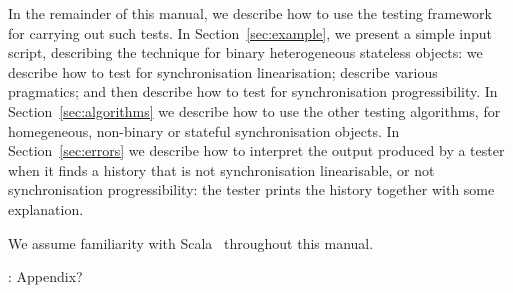 In the remainder of this manual, we describe how to use the testing framework
for carrying out such tests.  In Section~\ref{sec:example}, we present a
simple input script, describing the technique for binary heterogeneous
stateless objects: we describe how to test for synchronisation linearisation;
describe various pragmatics; and then describe how to test for synchronisation
progressibility.  In Section~\ref{sec:algorithms} we describe how to use the
other testing algorithms, for homegeneous, non-binary or stateful
synchronisation objects.   In Section~\ref{sec:errors} we describe how to
interpret the output produced by a tester when it finds a history that is not
synchronisation linearisable, or not synchronisation progressibility: the
tester prints the history together with some explanation.  \framebox{\ldots}


We assume familiarity with Scala~\cite{programming-in-Scala} throughout this
manual.


: Appendix?
